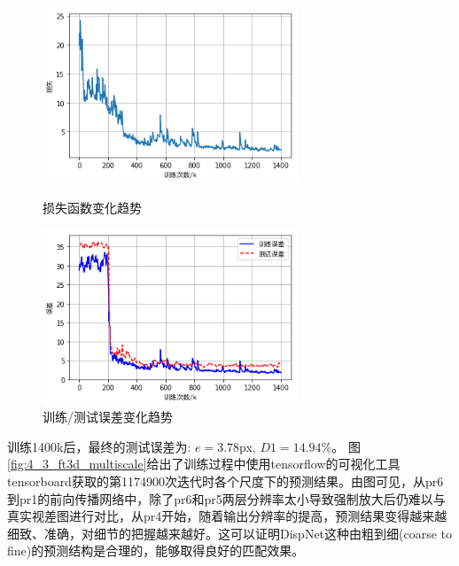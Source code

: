 \begin{figure}[htbp]
	\centering
	\begin{minipage}[c]{0.48\textwidth}
		\centering
		\includegraphics[width=3in]{figures/4_3_ft3d_loss}
		\caption{损失函数变化趋势}\label{fig:4_3_ft3d_loss}
	\end{minipage}
	\hfill
	\begin{minipage}[c]{0.48\textwidth}
		\centering
		\includegraphics[width=3in]{figures/4_3_ft3d_error}
		\caption{训练/测试误差变化趋势}\label{fig:4_3_ft3d_error}
	\end{minipage}
\end{figure}

训练1400k后，最终的测试误差为: $e = 3.78$px, $D1 = 14.94\%$。
图\ref{fig:4_3_ft3d_multiscale}给出了训练过程中使用tensorflow的可视化工具tensorboard获取的第1174900次迭代时各个尺度下的预测结果。由图可见，从pr6到pr1的前向传播网络中，除了pr6和pr5两层分辨率太小导致强制放大后仍难以与真实视差图进行对比，从pr4开始，随着输出分辨率的提高，预测结果变得越来越细致、准确，对细节的把握越来越好。这可以证明DispNet这种由粗到细(coarse to fine)的预测结构是合理的，能够取得良好的匹配效果。

